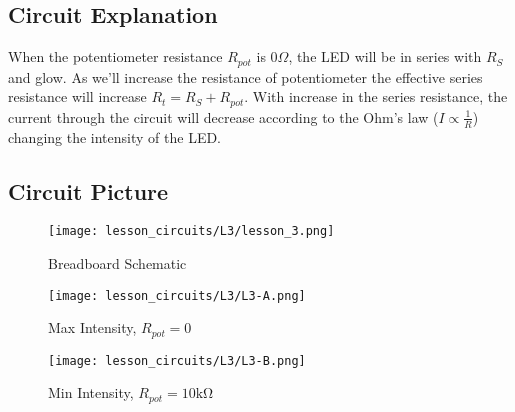 \subsection{Circuit Explanation}
When the potentiometer resistance $R_{pot}$ is $0\Omega$, the LED will be in series with $R_S$ and glow. As we'll increase the resistance of potentiometer the effective series resistance will increase $R_t = R_S + R_{pot}$. With increase in the series resistance, the current through the circuit will decrease according to the Ohm's law ($I \propto \frac{1}{R}$) changing the intensity of the LED.
\subsection{Circuit Picture}
\begin{figure}[!htp]
    \centering
    \texttt{[image: lesson\_circuits/L3/lesson\_3.png]}
    \caption{Breadboard Schematic}
    \label{fig:pot_led_sch}
\end{figure}
\begin{figure}[!htp]
    \centering
    \texttt{[image: lesson\_circuits/L3/L3-A.png]}
    \caption{Max Intensity, $R_{pot} = 0$}
    \label{fig:pot_led_max}
\end{figure}
\begin{figure}[!htp]
    \centering
    \texttt{[image: lesson\_circuits/L3/L3-B.png]}
    \caption{Min Intensity, $R_{pot} = 10\si{\kilo\ohm}$}
    \label{fig:pot_led_min}
\end{figure}


